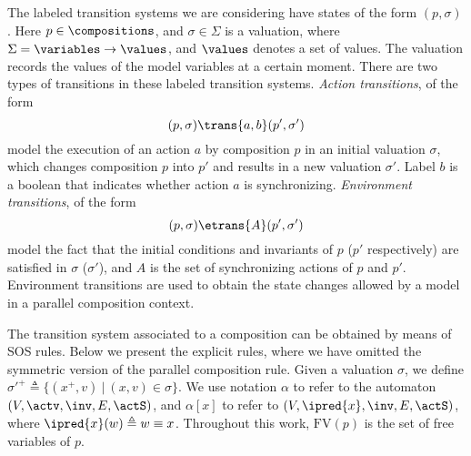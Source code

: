 \documentclass[submission,copyright,creativecommons,sharealike]{eptcs}
\begin{document}
The labeled transition systems we are considering have states of the
form $(p, \sigma)$. Here $p \in \compositions$, and $\sigma \in
\Sigma$ is a valuation, where $\Sigma = \variables \rightarrow
\values$, and $\values$ denotes a set of values. The valuation records
the values of the model variables at a certain moment.
There are two types of transitions in these labeled transition systems.
\emph{Action transitions}, of the form $$(p, \sigma) \trans{a, b} (p',
\sigma')$$ model the execution of an action $a$ by composition $p$ in
an initial valuation $\sigma$, which changes composition $p$ into $p'$
and results in a new valuation $\sigma'$.
Label $b$ is a boolean that indicates whether action $a$ is
synchronizing. \emph{Environment transitions}, of the form $$(p,
\sigma) \etrans{A} (p', \sigma')$$ model the fact that the initial
conditions and invariants of $p$ ($p'$ respectively) are satisfied in
$\sigma$ ($\sigma'$), and $A$ is the set of synchronizing
actions of $p$ and $p'$. Environment transitions are used to obtain
the state changes allowed by a model in a parallel composition
context.

The transition system associated to a composition can be obtained by
means of SOS rules. Below we present the explicit rules, where we have
omitted the symmetric version of the parallel composition rule. Given
a valuation $\sigma$, we define $\sigma'^+ \triangleq \{ (x^+, v) \ |\
(x, v) \in \sigma\}$. We use notation $\alpha$ to refer to the
automaton $ (V, \actv, \inv, E, \actS) $, and $\alpha[x]$ to refer to
$ (V, \ipred{x}, \inv, E, \actS)$, where $\ipred{x}(w) \triangleq w
\equiv x$. Throughout this work, $\mathrm{FV}(p)$ is the set of free
variables of $p$.
\end{document}
